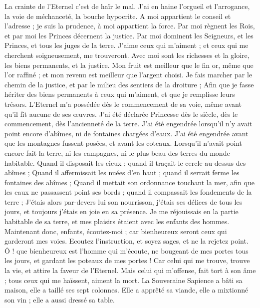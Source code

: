 \begin{multicols}{2}
La crainte de l'Eternel c'est de haïr le mal. J'ai en haine l'orgueil et l'arrogance, la voie de méchanceté, la bouche hypocrite.
A moi appartient le conseil et l'adresse ; je suis la prudence, à moi appartient la force.
Par moi règnent les Rois, et par moi les Princes décernent la justice.
Par moi dominent les Seigneurs, et les Princes, et tous les juges de la terre.
J'aime ceux qui m'aiment ; et ceux qui me cherchent soigneusement, me trouveront.
Avec moi sont les richesses et la gloire, les biens permanents, et la justice.
Mon fruit est meilleur que le fin or, même que l'or raffiné ; et mon revenu est meilleur que l'argent choisi.
Je fais marcher par le chemin de la justice, et par le milieu des sentiers de la droiture ;
Afin que je fasse hériter des biens permanents à ceux qui m'aiment, et que je remplisse leurs trésors.
L'Eternel m'a possédée dès le commencement de sa voie, même avant qu'il fît aucune de ses œuvres.
J'ai été déclarée Princesse dès le siècle, dès le commencement, dès l'ancienneté de la terre.
J'ai été engendrée lorsqu'il n'y avait point encore d'abîmes, ni de fontaines chargées d'eaux.
J'ai été engendrée avant que les montagnes fussent posées, et avant les coteaux.
Lorsqu'il n'avait point encore fait la terre, ni les campagnes, ni le plus beau des terres du monde habitable.
Quand il disposait les cieux ; quand il traçait le cercle au-dessus des abîmes ;
Quand il affermissait les nuées d'en haut ; quand il serrait ferme les fontaines des abîmes ;
Quand il mettait son ordonnance touchant la mer, afin que les eaux ne passassent point ses bords ; quand il compassait les fondements de la terre ;
J'étais alors par-devers lui son nourrisson, j'étais ses délices de tous les jours, et toujours j'étais en joie en sa présence.
Je me réjouissais en la partie habitable de sa terre, et mes plaisirs étaient avec les enfants des hommes.
Maintenant donc, enfants, écoutez-moi ; car bienheureux seront ceux qui garderont mes voies.
Ecoutez l'instruction, et soyez sages, et ne la rejetez point.
Ô ! que bienheureux est l'homme qui m'écoute, ne bougeant de mes portes tous les jours, et gardant les poteaux de mes portes !
Car celui qui me trouve, trouve la vie, et attire la faveur de l'Eternel.
Mais celui qui m'offense, fait tort à son âme ; tous ceux qui me haïssent, aiment la mort.
\VerseOne{}La Souveraine Sapience a bâti sa maison, elle a taillé ses sept colonnes.
Elle a apprêté sa viande, elle a mixtionné son vin ; elle a aussi dressé sa table.

\end{multicols}
